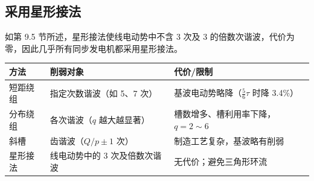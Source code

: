 \subsection{采用星形接法}
如第 9.5 节所述，星形接法使线电动势中不含 3 次及 3 的倍数次谐波，代价为零，因此几乎所有同步发电机都采用星形接法。

\begin{center}
\begin{tabular}{@{}p{2.4cm}p{4.0cm}p{5.6cm}@{}}
\toprule
方法 & 削弱对象 & 代价/限制 \\
\midrule
短距绕组 & 指定次数谐波（如 5、7 次） & 基波电动势略降（$\tfrac56\tau$ 时降 3.4\%） \\
分布绕组 & 各次谐波（$q$ 越大越显著） & 槽数增多、槽利用率下降，$q=2\sim6$ \\
斜槽 & 齿谐波（$Q/p\pm1$ 次） & 制造工艺复杂，基波略有削弱 \\
星形接法 & 线电动势中的 3 次及倍数次谐波 & 无代价；避免三角形环流 \\
\bottomrule
\end{tabular}
\end{center}

